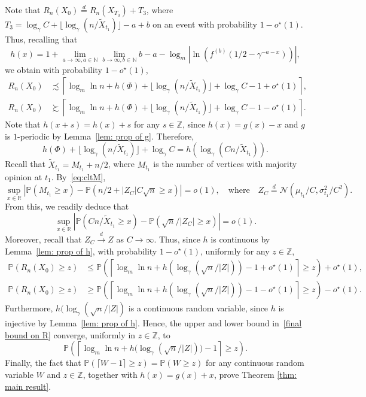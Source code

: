\documentclass[11pt]{article}
\newcommand{\Prob}{\mathbb{P}}
\numberwithin{theorem}{section}
\begin{document}
Note that $R_n(X_0)\stackrel{d}{=}R_n(X_{T_3})+T_3$, where $T_3= \log_\gamma C+\lfloor \log_\gamma(n/\tilde X_{t_1})\rfloor-a+b$ on an event with probability $1-o^\star(1)$. Thus, recalling that
\[
    h(x)=1+\lim_{a\to \infty, a\in\mathbb{N}} \lim_{b \to \infty, b\in \mathbb{N}} b-a- \log_m|\ln( f^{(b)}(1/2-\gamma^{-a-x}))|,
\]
we obtain with probability $1-o^\star(1)$,
\begin{align*}
    R_n(X_{0}) &\precsim\left\lceil \log_m\ln n+h(\Phi)+\lfloor\log_\gamma(n/\tilde X_{t_1})\rfloor+\log_\gamma C-1+o^\star(1) \right\rceil, \\
    R_n(X_{0}) &\succsim \left\lceil \log_m\ln n+h(\Phi)+\lfloor\log_\gamma(n/\tilde X_{t_1})\rfloor+\log_\gamma C-1-o^\star(1) \right\rceil.    
\end{align*}
Note that $h(x+s)=h(x)+s$ for any $s\in\mathbb{Z}$, since $h(x)=g(x)-x$ and $g$ is $1$-periodic by Lemma~\ref{lem: prop of g}.
Therefore, 
\[
h(\Phi)+\lfloor\log_\gamma(n/\tilde X_{t_1})\rfloor+\log_\gamma C = h\left(\log_\gamma(Cn/\tilde X_{t_1})\right).
\]
Recall that $\tilde X_{t_1} = M_{t_1}+n/2$, where $M_{t_1}$ is the number of vertices with majority opinion at $t_1$. By~\eqref{eq:cltM},
\[
\sup_{x\in\mathbb{R}}|\Prob(M_{t_1}\geq x) - \Prob(n/2+|Z_C|C\sqrt{n}\geq x)| = o(1),
\quad\text{where}\quad Z_{C} \stackrel{d}{=} \mathcal{N}(\mu_{t_1}/C,\sigma_{t_1}^2/C^2).
\]
From this, we readily deduce that 
\[
\sup_{x\in\mathbb{R}}|\Prob(Cn/\tilde X_{t_1}\geq x) - \Prob(\sqrt{n}/|Z_C|\geq x)| = o(1).
\]
Moreover, recall that $Z_C\stackrel{d}{\to}Z$ as $C\to\infty$. Thus, since $h$ is continuous by Lemma~\ref{lem: prop of h}, with probability $1-o^\star(1)$, uniformly for any $z\in \mathbb{Z}$,
\begin{equation}
\begin{aligned}
    \Prob(R_n(X_0) \geq z ) &\leq \Prob(\left\lceil \log_m\ln n+h(\log_\gamma(\sqrt{n}/|Z|))-1+o^\star(1) \right\rceil \geq z) + o^\star(1), \\
    \Prob(R_n(X_0) \geq z ) &\geq \Prob(\left\lceil \log_m\ln n+h(\log_\gamma(\sqrt{n}/|Z|))-1-o^\star(1) \right\rceil \geq z) - o^\star(1).    
\end{aligned}
\label{final bound on R}
\end{equation}
Furthermore, $h(\log_\gamma(\sqrt{n}/|Z|)$ is a continuous random variable, since $h$ is injective by Lemma~\ref{lem: prop of h}. Hence, the upper and lower bound in~\eqref{final bound on R} converge, uniformly in $z\in\mathbb{Z}$, to
\[
    \Prob\left(
        \left\lceil 
            \log_m\ln n + h\big(\log_\gamma(\sqrt{n}/|Z|)\big)-1
        \right\rceil \geq z\right) .
\]
Finally, the fact that $\Prob(\lceil W-1\rceil\geq z)=\Prob(W\geq z)$ for any continuous random variable $W$ and $z\in \mathbb{Z}$, together with $h(x)=g(x)+x$, prove Theorem \ref{thm: main result}.
\end{document}
